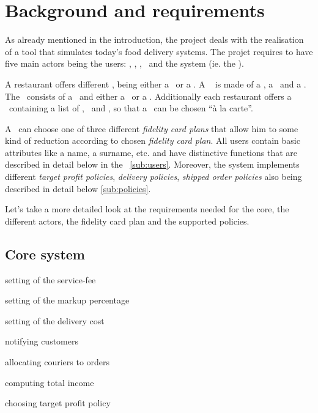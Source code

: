 \section{Background and requirements} %
\label{sec:background}

As already mentioned in the introduction, the project deals with the realisation of
a tool that simulates today's food delivery systems. The projet requires to have five main 
actors being the users: \Restaurant, \Customer, \Manager, \Courier~and the system (ie. the \Core).

A restaurant offers different \Meal, being either a \HalfMeal~or a  
\FullMeal. A \FullMeal~ is made of a \Starter, a \MainDish~and a \Dessert.
The \HalfMeal~consists of a \MainDish~and either a \Starter~or a \Dessert. 
Additionally each restaurant offers a \Menu~containing 
a list of \Starter, \MainDish~and \Dessert, so that a \Meal~can be chosen ``à la carte''. 

A \Customer~can choose one of three different \emph{fidelity card plans}
that allow him to some kind of reduction 
according to chosen \emph{fidelity card plan}.
All users contain basic attributes like a name, a surname, etc.
and have distinctive functions that are described 
in detail below in the ~\ref{sub:users}.
Moreover, the system implements different \emph{target profit policies},
\emph{delivery policies}, \emph{shipped order policies}
also being described in detail below \ref{sub:policies}.

Let's take a more detailed look at the requirements
needed for the core, the different actors,
the fidelity card plan and the supported policies.

\subsection{Core system} %
\label{sub:core_system}
\vspace{0.3\baselineskip}

\begin{itemize}
  \begin{minipage}{0.51\linewidth}
    \item setting of the service-fee
    \item setting of the markup percentage
    \item setting of the delivery cost
    \item notifying customers
  \end{minipage}
  \begin{minipage}{0.57\linewidth}
   \item allocating couriers to orders
   \item computing total income 
   \item choosing target profit policy
  \end{minipage}
\end{itemize}


